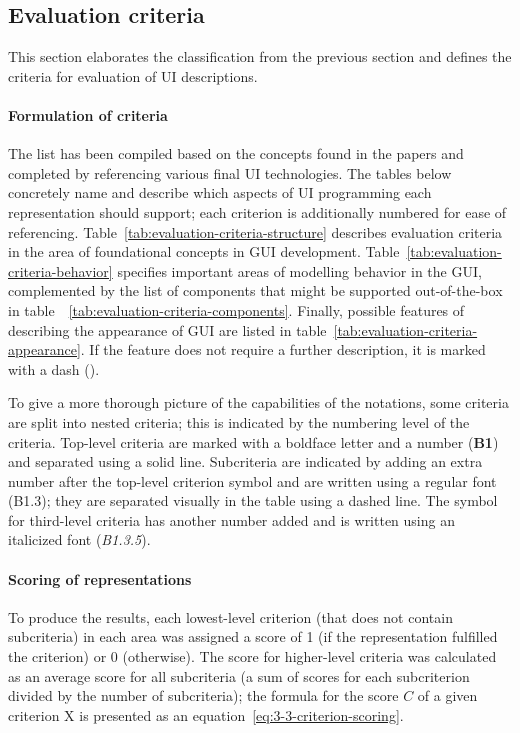\subsection{Evaluation criteria}\label{subsec:evaluation-criteria}

This section elaborates the classification from the previous section and defines the criteria for evaluation of UI descriptions.

\paragraph{Formulation of criteria}
The list has been compiled based on the concepts found in the papers and completed by referencing various final UI technologies.
The tables below concretely name and describe which aspects of UI programming each representation should support;
each criterion is additionally numbered for ease of referencing.
Table~\ref{tab:evaluation-criteria-structure} describes evaluation criteria in the area of foundational concepts in GUI development.
Table~\ref{tab:evaluation-criteria-behavior} specifies important areas of modelling behavior in the GUI, complemented by the list of components that might be supported out-of-the-box in table~~\ref{tab:evaluation-criteria-components}.
Finally, possible features of describing the appearance of GUI are listed in table~\ref{tab:evaluation-criteria-appearance}.
If the feature does not require a further description, it is marked with a dash (\textemdash).

To give a more thorough picture of the capabilities of the notations, some criteria are split into nested criteria;
this is indicated by the numbering level of the criteria.
Top-level criteria are marked with a boldface letter and a number (\textbf{B1}) and separated using a solid line.
Subcriteria are indicated by adding an extra number after the top-level criterion symbol and are written using a regular font (B1.3);
they are separated visually in the table using a dashed line.
The symbol for third-level criteria has another number added and is written using an italicized font (\textit{B1.3.5}).

\paragraph{Scoring of representations}
To produce the results, each lowest-level criterion (that does not contain subcriteria) in each area was assigned a score of 1 (if the representation fulfilled the criterion) or 0 (otherwise).
The score for higher-level criteria was calculated as an average score for all subcriteria (a sum of scores for each subcriterion divided by the number of subcriteria);
the formula for the score $C$ of a given criterion X is presented as an equation~\ref{eq:3-3-criterion-scoring}.

